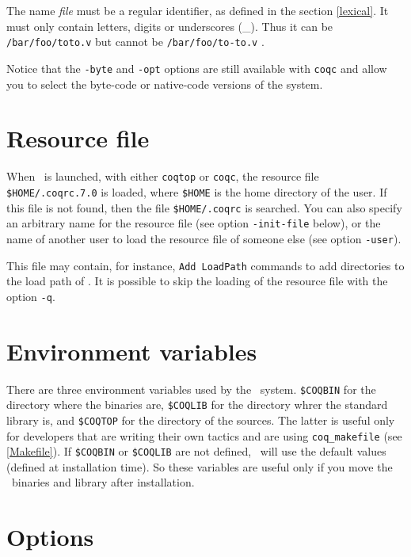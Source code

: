 \Warning The name {\em file} must be a regular {\Coq} identifier, as
defined in the section \ref{lexical}. It
must only contain letters, digits or underscores
(\_). Thus it can be \verb+/bar/foo/toto.v+ but cannot be
\verb+/bar/foo/to-to.v+ . 

Notice that the \verb!-byte! and \verb!-opt! options are still
available with \verb!coqc!  and allow you to select the byte-code or
native-code versions of the system.


\section{Resource file}

When \Coq\ is launched, with either {\tt coqtop} or {\tt coqc}, the
resource file \verb:$HOME/.coqrc.7.0: is loaded, where \verb:$HOME: is
the home directory of the user.  If this file is not found, then the
file \verb:$HOME/.coqrc: is searched. You can also specify an
arbitrary name for the resource file (see option \verb:-init-file:
below), or the name of another user to load the resource file of
someone else (see option \verb:-user:).

This file may contain, for instance, \verb:Add LoadPath: commands to add
directories to the load path of \Coq.
It is possible to skip the loading of the resource file with the
option \verb:-q:.

\section{Environment variables}
\label{EnvVariables}

There are three environment variables used by the \Coq\ system.
\verb:$COQBIN: for the directory where the binaries are,
\verb:$COQLIB: for the directory whrer the standard library is, and 
\verb:$COQTOP: for the directory of the sources. The latter is useful
only for developers that are writing their own tactics and are using
\texttt{coq\_makefile} (see \ref{Makefile}). If \verb:$COQBIN: or
\verb:$COQLIB: are not defined, \Coq\ will use the default values
(defined at installation time). So these variables are useful only if
you move the \Coq\ binaries and library after installation.

\section{Options}

